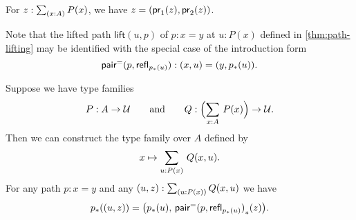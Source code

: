\documentclass[hott-all.tex]{subfiles}
\begin{document}
\begin{cor}\label{thm:eta-sigma}
  For $z:\sm{x:A} P(x)$, we have $z = (\mathsf{pr}_{1}(z),\mathsf{pr}_{2}(z))$.
\end{cor}
%
%
Note that the lifted path $\mathsf{lift}(u,p)$  of $p:x=y$ at $u:P(x)$ defined in \cref{thm:path-lifting} may be identified with the special case of the introduction form
\[\mathsf{pair}^{\mathord{=}}(p,\mathsf{refl}_{{p}_{*}\mathopen{}\left({u}\right)\mathclose{}}):(x,u) = (y,{p}_{*}\mathopen{}\left({u}\right)\mathclose{}).\]

\begin{thm}\label{transport-Sigma}
  Suppose we have type families
  \begin{equation*}
    P:A\to\type
    \qquad\text{and}\qquad
    Q:\Parens{\sm{x:A} P(x)}\to\type.
  \end{equation*}
  Then we can construct the type family over $A$ defined by
  \begin{equation*}
    x \mapsto \sm{u:P(x)} Q(x,u).
  \end{equation*}
  For any path $p:x=y$ and any $(u,z):\sm{u:P(x)} Q(x,u)$ we have
  \begin{equation*}
    {p}_{*}\mathopen{}\left({(u,z)}\right)\mathclose{}=\big({p}_{*}\mathopen{}\left({u}\right)\mathclose{},\,{\mathsf{pair}^{\mathord{=}}(p,\mathsf{refl}_{{p}_{*}\mathopen{}\left({u}\right)\mathclose{}})}_{*}\mathopen{}\left({z}\right)\mathclose{}\big).
  \end{equation*}
\end{thm}
%
%
%
\end{document}
